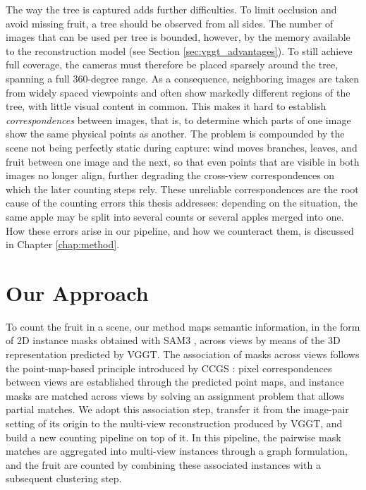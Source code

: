 \documentclass[english, egger, bsc]{vcethesis}
\begin{document}
The way the tree is captured adds further difficulties. To limit occlusion and avoid missing fruit, a tree should be observed from all sides. The number of images that can be used per tree is bounded, however, by the memory available to the reconstruction model (see Section \ref{sec:vggt_advantages}). To still achieve full coverage, the cameras must therefore be placed sparsely around the tree, spanning a full 360-degree range. As a consequence, neighboring images are taken from widely spaced viewpoints and often show markedly different regions of the tree, with little visual content in common. This makes it hard to establish \emph{correspondences} between images, that is, to determine which parts of one image show the same physical points as another. The problem is compounded by the scene not being perfectly static during capture: wind moves branches, leaves, and fruit between one image and the next, so that even points that are visible in both images no longer align, further degrading the cross-view correspondences on which the later counting steps rely. These unreliable correspondences are the root cause of the counting errors this thesis addresses: depending on the situation, the same apple may be split into several counts or several apples merged into one. How these errors arise in our pipeline, and how we counteract them, is discussed in Chapter \ref{chap:method}.

\section{Our Approach}

To count the fruit in a scene, our method maps semantic information, in the form of 2D instance masks obtained with SAM3 \cite{carion2026sam3segmentconcepts}, across views by means of the 3D representation predicted by VGGT. The association of masks across views follows the point-map-based principle introduced by CCGS \cite{hu2026ccgs}: pixel correspondences between views are established through the predicted point maps, and instance masks are matched across views by solving an assignment problem that allows partial matches. We adopt this association step, transfer it from the image-pair setting of its origin to the multi-view reconstruction produced by VGGT, and build a new counting pipeline on top of it. In this pipeline, the pairwise mask matches are aggregated into multi-view instances through a graph formulation, and the fruit are counted by combining these associated instances with a subsequent clustering step.
\end{document}
